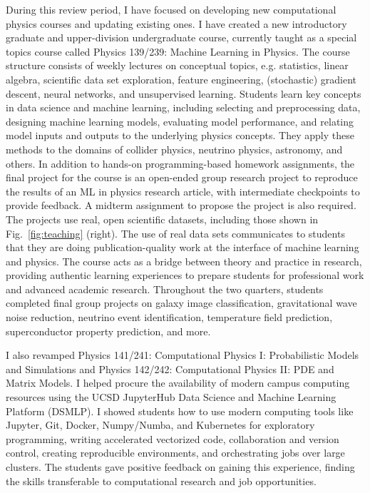 \documentclass[11pt,letterpaper,notitlepage]{article}
\begin{document}
During this review period, I have focused on developing new computational physics courses and updating existing ones.
I have created a new introductory graduate and upper-division undergraduate course, currently taught as a special topics course called Physics 139/239: Machine Learning in Physics.
The course structure consists of weekly lectures on conceptual topics, e.g. statistics, linear algebra, scientific data set exploration, feature engineering, (stochastic) gradient descent, neural networks, and unsupervised learning.
Students learn key concepts in data science and machine learning, including selecting and preprocessing data, designing machine learning models, evaluating model performance, and relating model inputs and outputs to the underlying physics concepts.
They apply these methods to the domains of collider physics, neutrino physics, astronomy, and others.
In addition to hands-on programming-based homework assignments, the final project for the course is an open-ended group research project to reproduce the results of an ML in physics research article, with intermediate checkpoints to provide feedback.
A midterm assignment to propose the project is also required.
The projects use real, open scientific datasets, including those shown in Fig.~\ref{fig:teaching} (right).
The use of real data sets communicates to students that they are doing publication-quality work at the interface of machine learning and physics.
The course acts as a bridge between theory and practice in research, providing authentic learning experiences to prepare students for professional work and advanced academic research.
Throughout the two quarters, students completed final group projects on galaxy image classification, gravitational wave noise reduction, neutrino event identification, temperature field prediction, superconductor property prediction, and more.

I also revamped Physics 141/241: Computational Physics I: Probabilistic Models and Simulations and Physics 142/242: Computational Physics II: PDE and Matrix Models.
I helped procure the availability of modern campus computing resources using the UCSD JupyterHub Data Science and Machine Learning Platform (DSMLP).
I showed students how to use modern computing tools like Jupyter, Git, Docker, Numpy/Numba, and Kubernetes for exploratory programming, writing accelerated vectorized code, collaboration and version control, creating reproducible environments, and orchestrating jobs over large clusters.
The students gave positive feedback on gaining this experience, finding the skills transferable to computational research and job opportunities.
\end{document}
